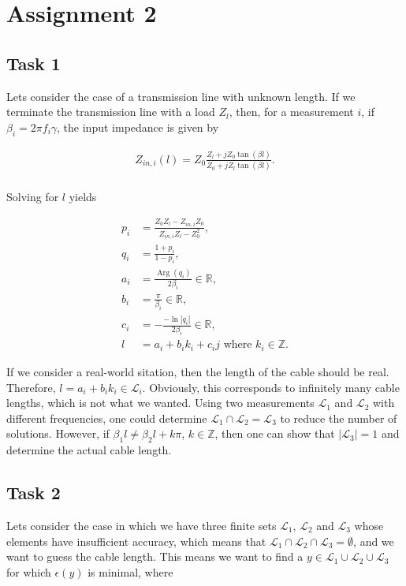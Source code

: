 \documentclass[11pt,titlepage]{report}
\begin{document}
\chapter{Assignment 2}
\section{Task 1}
Lets consider the case of a transmission line with unknown length. If we terminate the transmission line with a load $Z_l$, then, for a measurement $i$, if $\beta_i=2 \pi f_i \gamma$, the input impedance is given by

\begin{align}
	Z_{in,i}(l)=Z_0\frac{Z_l+j Z_0 \tan{(\beta l)}}{Z_0+j Z_l \tan{(\beta l)}}. \\
\end{align}

Solving for $l$ yields

\begin{align}
	p_i &= \frac{Z_0 Z_l - Z_{in,i} Z_0}{Z_{in,i} Z_l - Z_0^2}, \\
	q_i &= \frac{1+p_i}{1-p_i}, \\
	a_i &= \frac{\operatorname{Arg}(q_i)}{ 2\beta_i} \in \mathbb{R}, \\
	b_i &= \frac{\pi}{\beta_i} \in \mathbb{R}, \\
	c_i &= -\frac{-\operatorname{ln}|q_i|}{2 \beta_i} \in \mathbb{R}, \\
	l &= a_i + b_i k_i + c_i j \text{ where } k_i \in \mathbb{Z}.
\end{align}

If we consider a real-world sitation, then the length of the cable should be real. Therefore, $l=a_i+b_i k_i \in \mathcal{L}_i$. Obviously, this corresponds to infinitely many cable lengths, which is not what we wanted. Using two measurements $\mathcal{L}_1$ and $\mathcal{L}_2$ with different frequencies, one could determine $\mathcal{L}_1 \cap \mathcal{L}_2 = \mathcal{L}_3$ to reduce the number of solutions. However, if $\beta_{1} l \neq \beta_{2} l + k \pi$, $k \in \mathbb{Z}$, then one can show that $|\mathcal{L}_3|=1$ and determine the actual cable length.

\section{Task 2}
Lets consider the case in which we have three finite sets $\mathcal{L}_1$, $\mathcal{L}_2$ and $\mathcal{L}_3$ whose elements have insufficient accuracy, which means that $\mathcal{L}_1 \cap \mathcal{L}_2 \cap \mathcal{L}_3 = \emptyset$, and we want to guess the cable length. This means we want to find a $y \in \mathcal{L}_1 \cup \mathcal{L}_2 \cup \mathcal{L}_3$ for which $\epsilon(y)$ is minimal, where
\end{document}
